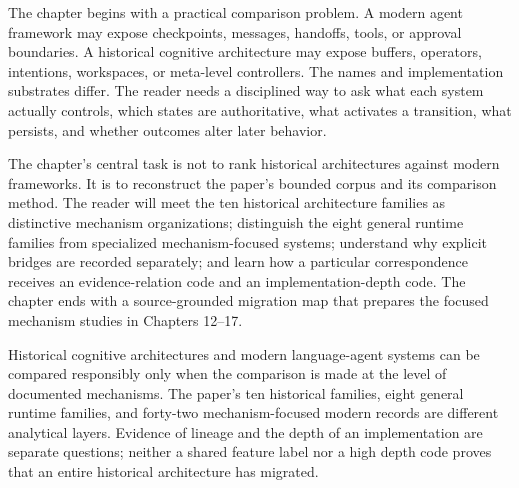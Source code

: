 The chapter begins with a practical comparison problem. A modern agent framework may expose checkpoints, messages, handoffs, tools, or approval boundaries. A historical cognitive architecture may expose buffers, operators, intentions, workspaces, or meta-level controllers. The names and implementation substrates differ. The reader needs a disciplined way to ask what each system actually controls, which states are authoritative, what activates a transition, what persists, and whether outcomes alter later behavior.

The chapter's central task is not to rank historical architectures against modern frameworks. It is to reconstruct the paper's bounded corpus and its comparison method. The reader will meet the ten historical architecture families as distinctive mechanism organizations; distinguish the eight general runtime families from specialized mechanism-focused systems; understand why explicit bridges are recorded separately; and learn how a particular correspondence receives an evidence-relation code and an implementation-depth code. The chapter ends with a source-grounded migration map that prepares the focused mechanism studies in Chapters 12--17.

\begin{takeawaybox}
Historical cognitive architectures and modern language-agent systems can be compared responsibly only when the comparison is made at the level of documented mechanisms. The paper's ten historical families, eight general runtime families, and forty-two mechanism-focused modern records are different analytical layers. Evidence of lineage and the depth of an implementation are separate questions; neither a shared feature label nor a high depth code proves that an entire historical architecture has migrated.
\end{takeawaybox}

